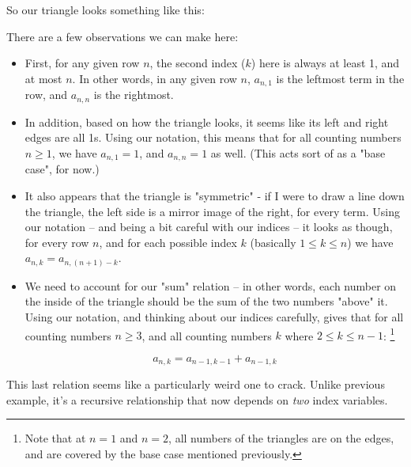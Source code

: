 So our triangle looks something like this:


There are a few observations we can make here:

\begin{itemize}
\item First, for any given row $n$, the second index ($k$) here is always at least 1, and at most $n$. In other words, in any given row $n$, $a_{n,1}$ is the leftmost term in the row, and $a_{n,n}$ is the rightmost. 
\item In addition, based on how the triangle looks, it seems like its left and right edges are all 1s. Using our notation, this means that for all counting numbers $n \geq 1$, we have $a_{n,1} = 1$, and $a_{n,n} = 1$ as well. (This acts sort of as a "base case", for now.)
\item It also appears that the triangle is "symmetric" - if I were to draw a line down the triangle, the left side is a mirror image of the right, for every term. Using our notation -- and being a bit careful with our indices -- it looks as though, for every row $n$, and for each possible index $k$ (basically $1 \leq k \leq n$) we have $a_{n,k} = a_{n,(n+1) - k}$. 

\item We need to account for our "sum" relation -- in other words, each number on the inside of the triangle should be the sum of the two numbers "above" it. Using our notation, and thinking about our indices carefully, gives that for all counting numbers $n \geq 3$, and all counting numbers $k$ where $2 \leq k \leq n-1$: \footnote{Note that at $n = 1$ and $n = 2$, all numbers of the triangles are on the edges, and are covered by the base case mentioned previously.}


\begin{equation}
\label{ex:pascal-rule-mys}
a_{n,k} = a_{n-1,k-1} + a_{n-1,k}
\end{equation}
\end{itemize}

This last relation seems like a particularly weird one to crack. Unlike previous example, it's a recursive relationship that now depends on \emph{two} index variables.

